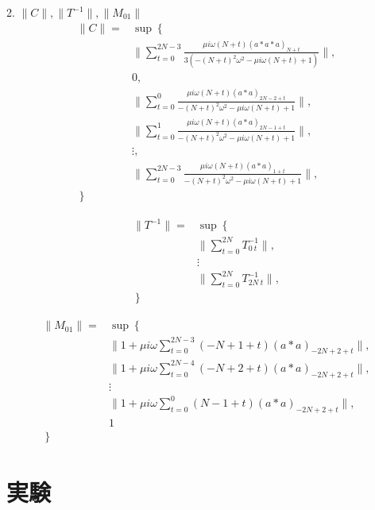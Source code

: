 \documentclass[11pt,a4paper]{jsarticle}
\theoremstyle{definition}
\begin{document}
2. $\|C\|, \|T^{-1}\|, \|M_{01}\|$
\begin{equation}
  \begin{split}
    \|C\| =& \sup \left\lbrace \right. \\
    & \| \sum_{t=0}^{2N-3} \frac{\mu i \omega (N+t) (a*a*a)_{N+t}}{3(-(N+t)^2 \omega^2 - \mu i \omega (N+t)+ 1)} \|,\\
    & 0,\\
    & \| \sum_{t=0}^{0} \frac{ \mu i \omega (N+t) (a*a)_{2N-2 + t}}{-(N+t)^2 \omega^2 - \mu i \omega (N+t)+ 1} \|,\\
    & \| \sum_{t=0}^{1} \frac{ \mu i \omega (N+t) (a*a)_{2N-1 + t} }{-(N+t)^2 \omega^2 - \mu i \omega (N+t)+ 1}\|,\\
    & \vdots , \\
    & \| \sum_{t=0}^{2N-3} \frac{ \mu i \omega (N+t) (a*a)_{1 + t} }{-(N+t)^2 \omega^2 - \mu i \omega (N+t)+ 1}\|,\\
    \left. \right\rbrace&
  \end{split}
\end{equation}


\begin{equation}
  \begin{split}
    \|T^{-1}\| =& \sup \left\lbrace \right. \\
    & \|\sum_{t=0}^{2N} T_{0\ t}^{-1}\|, \\
    & \vdots \\
    & \|\sum_{t=0}^{2N} T_{2N\ t}^{-1}\|, \\
    \left. \right\rbrace&
  \end{split}
\end{equation}

\begin{equation}
  \begin{split}
    \|M_{01}\| =& \sup \left\lbrace \right. \\
    &\| 1 + \mu i \omega \sum_{t=0}^{2N-3} (-N+1 + t) (a*a)_{-2N+2+t} \| , \\
    &\| 1 + \mu i \omega \sum_{t=0}^{2N-4} (-N+2 + t) (a*a)_{-2N+2+t} \| , \\
    & \vdots \\
    &\| 1 + \mu i \omega \sum_{t=0}^{0} (N-1 + t) (a*a)_{-2N+2+t} \| , \\
    & 1 \\
    \left. \right\rbrace&
  \end{split}
\end{equation}


\section{実験}
\end{document}

